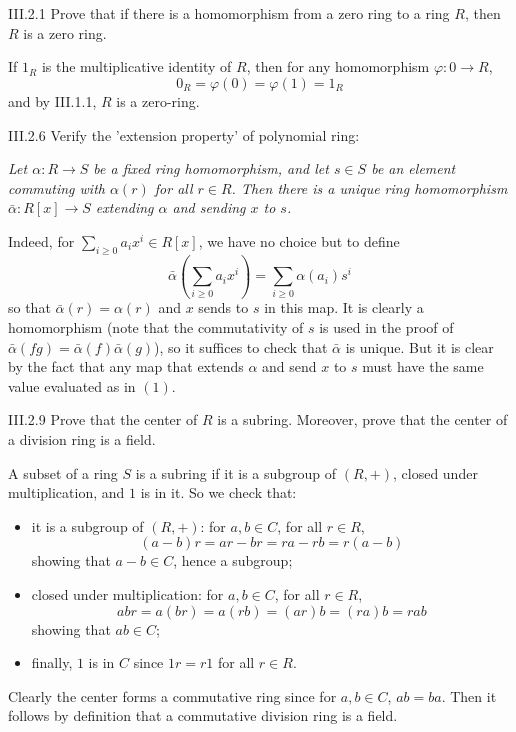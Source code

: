 \section{}
\begin{problem}{III.2.1}
Prove that if there is a homomorphism from a zero ring to a ring $R$, then $R$ is a zero ring.
\end{problem}
\begin{pf}
If $1_R$ is the multiplicative identity of $R$, then for any homomorphism $\varphi : 0 \to R$, 
\[
0_R = \varphi(0) = \varphi(1) = 1_R
\]
and by III.1.1, $R$ is a zero-ring.
\end{pf}

\begin{problem}{III.2.6}
Verify the 'extension property' of polynomial ring:

\textit{
Let $\alpha : R \to S$ be a fixed ring homomorphism, and let $s \in S$ be an element commuting with $\alpha(r)$ for all $r \in R$. Then there is a unique ring homomorphism $\bar{\alpha} : R[x] \to S$ extending $\alpha$ and sending $x$ to $s$.
}
\end{problem}
\begin{pf}
Indeed, for $\sum_{i \geq 0} a_ix^i \in R[x]$, we have no choice but to define
\[
\bar{\alpha}\left(\sum_{i \geq 0} a_ix^i\right) = \sum_{i \geq 0}\alpha(a_i)s^{i}  \tag{1}
\]
so that $\bar{\alpha}(r) = \alpha(r)$ and $x$ sends to $s$ in this map. It is clearly a homomorphism (note that the commutativity of $s$ is used in the proof of $\bar{\alpha}(fg) = \bar{\alpha}(f)\bar{\alpha}(g)$), so it suffices to check that $\bar{\alpha}$ is unique. But it is clear by the fact that any map that extends $\alpha$ and send $x$ to $s$ must have the same value evaluated as in $(1)$.
\end{pf}

\begin{problem}{III.2.9}
Prove that the center of $R$ is a subring. Moreover, prove that the center of a division ring is a field.
\end{problem}
\begin{pf}
A subset of a ring $S$ is a subring if it is a subgroup of $(R,+)$, closed under multiplication, and $1$ is in it. So we check that:
\begin{itemize}
\setlength\itemsep{0pt}
\item it is a subgroup of $(R,+)$: for $a,b \in C$, for all $r \in R$,
\[
(a-b)r = ar - br = ra - rb = r(a-b)    
\]
showing that $a-b \in C$, hence a subgroup;
\item closed under multiplication: for $a,b \in C$, for all $r \in R$,
\[
abr = a(br) = a(rb) = (ar)b = (ra)b = rab     
\]
showing that $ab \in C$;
\item finally, $1$ is in $C$ since $1r = r1$ for all $r \in R$.
\end{itemize}


Clearly the center forms a commutative ring since for $a,b \in C$, $ab = ba$. Then it follows by definition that a commutative division ring is a field. 
\end{pf}

